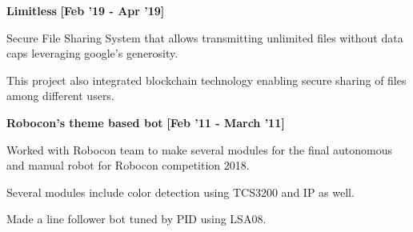 \begin{itemize*}
    \item \textbf{\small{Limitless}} \hfill {\small{{\textbf{[Feb '19 - Apr '19]}}}\/} 
    \begin{itemize*}
    	\item Secure File Sharing System that allows transmitting unlimited files without data caps leveraging google's generosity.
    	\item This project also integrated blockchain technology enabling secure sharing of files among different users.
    \end{itemize*}
    
    
    \item \textbf{\small{Robocon's theme based bot}} \hfill {\small{{\textbf{[Feb '11 - March '11]}}}\/} 
    \begin{itemize*}
    	\item Worked with Robocon team to make several modules for the final autonomous and manual robot for Robocon competition 2018.
    	\item Several modules include color detection using TCS3200 and IP as well.
    	\item Made a line follower bot tuned by PID using LSA08.
    \end{itemize*}

\end{itemize*}

















